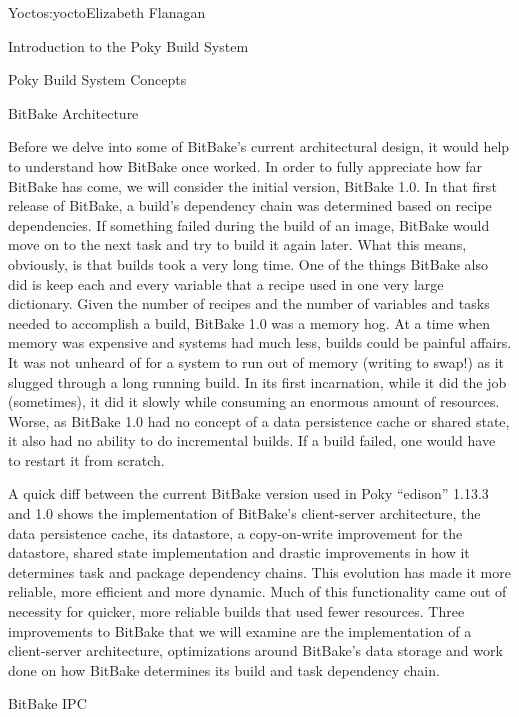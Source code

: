 \begin{aosachapter}{Yocto}{s:yocto}{Elizabeth Flanagan}
\begin{aosasect1}{Introduction to the Poky Build System}
\begin{aosasect2}{Poky Build System Concepts}
\end{aosasect2}

\end{aosasect1}

\begin{aosasect1}{BitBake Architecture}

Before we delve into some of BitBake's current architectural design,
it would help to understand how BitBake once worked. In
order to fully appreciate how far BitBake has come, we will consider the
initial version, BitBake 1.0. In that first release of BitBake, a
build's dependency chain was determined based on recipe
dependencies. If something failed during the build of an image,
BitBake would move on to the next task and try to build it again later.
What this means, obviously, is that builds took a very long time. One
of the things BitBake also did is keep each and every variable that a
recipe used in one very large dictionary. Given the number of recipes
and the number of variables and tasks needed to accomplish a build,
BitBake 1.0 was a memory hog. At a time when memory was expensive and
systems had much less, builds could be painful affairs. It was not
unheard of for a system to run out of memory (writing to swap!)  as it
slugged through a long running build. In its first incarnation, while
it did the job (sometimes), it did it slowly while consuming an enormous
amount of resources. Worse, as BitBake 1.0 had no concept of a data persistence
cache or shared state, it also had no ability to do incremental
builds. If a build failed, one would have to restart it from
scratch.

A quick diff between the current BitBake version used in Poky
``edison'' 1.13.3 and 1.0 shows the implementation of BitBake's
client-server architecture, the data persistence cache, its datastore,
a copy-on-write improvement for the datastore, shared state
implementation and drastic improvements in how it determines task
and package dependency chains. This evolution has made it more
reliable, more efficient and more dynamic. Much of this functionality
came out of necessity for quicker, more reliable builds that used fewer
resources. Three improvements to BitBake that we will examine are the
implementation of a client-server architecture, optimizations around
BitBake's data storage and work done on how BitBake determines its
build and task dependency chain.

\begin{aosasect2}{BitBake IPC}


\end{aosasect2}
\end{aosasect1}
\end{aosachapter}
